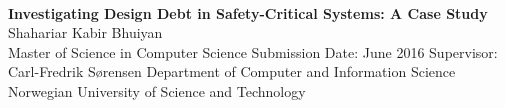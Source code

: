 
\thispagestyle{empty}
\mbox{}\\[6pc]

\begin{center}
\Huge{\textbf{Investigating Design Debt in Safety-Critical Systems: A Case Study}}\\[4pc]
\Large{Shahariar Kabir Bhuiyan}\\[1pc]


\noindent Master of Science in Computer Science
\linebreak
\noindent Submission Date: June 2016
\linebreak
\noindent Supervisor: Carl-Fredrik Sørensen
\linebreak
\linebreak
\noindent Department of Computer and Information Science\\
\noindent Norwegian University of Science and Technology
\end{center}

\vfill


